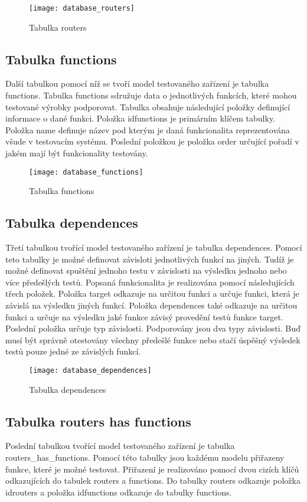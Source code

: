 \begin{figure}[h]
  \centering
  \texttt{[image: database\_routers]}
  \caption{Tabulka routers}
  \label{fig:database_routers}
\end{figure}

\subsection{Tabulka functions}
Další tabulkou pomocí níž se tvoří model testovaného zařízení je tabulka functions. Tabulka functions sdružuje data o jednotlivých funkcích, které mohou testované výrobky podporovat. Tabulka obsahuje následující položky definující informace o dané funkci. Položka idfunctions je primárním klíčem tabulky. Položka name definuje název pod kterým je daná funkcionalita reprezentována všude v testovacím systému. Poslední položkou je položka order určující pořadí v jakém mají být funkcionality testovány.

\begin{figure}[h]
  \centering
  \texttt{[image: database\_functions]}
  \caption{Tabulka functions}
  \label{fig:database_functions}
\end{figure}

\subsection{Tabulka dependences}
Třetí tabulkou tvořící model testovaného zařízení je tabulka dependences. Pomocí teto tabulky je možné definovat závisloti jednotlivých funkcí na jiných. Tudíž je možné definovat spuštění jednoho testu v závislosti na výsledku jednoho nebo více předešlých testů. Popsaná funkcionalita je realizována pomocí následujících třech položek. Položka target odkazuje na určitou funkci a určuje funkci, která je závislá na výsledku jiných funkcí. Položka dependences také odkazuje na určitou funkci a určuje na výsledku jaké funkce závisý provedění testů funkce target.
Poslední položka určuje typ závislosti. Podporovány jsou dva typy závislosti. Buď musí být správně otestovány všechny předešlé funkce nebo stačí úspěšný výsledek testů pouze jedné ze závislých funkcí.

\begin{figure}[h]
  \centering
  \texttt{[image: database\_dependences]}
  \caption{Tabulka dependences}
  \label{fig:database_dependences}
\end{figure}

\subsection{Tabulka routers has functions}
Poslední tabulkou tvořící model testovaného zařízení je tabulka routers\_has\_functions. Pomocí této tabulky jsou každému modelu přiřazeny funkce, které je možné testovat. Přiřazení je realizováno pomocí dvou cizích klíčů odkazujících do tabulek routers a functions. Do tabulky routers odkazuje položka idrouters a položka idfunctions odkazuje do tabulky functions.

